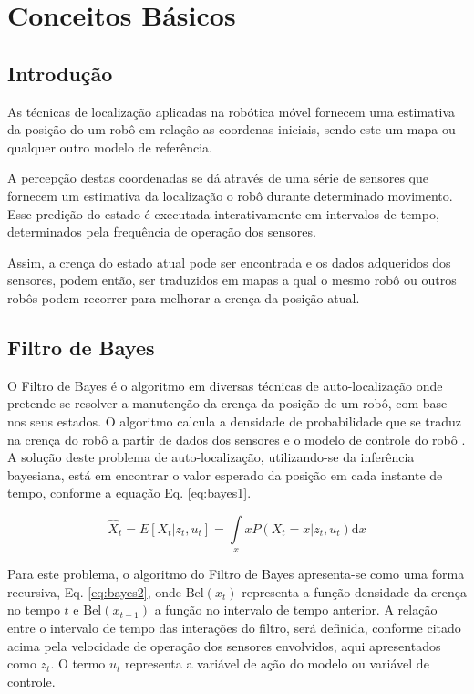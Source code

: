 \chapter{Conceitos Básicos}

 
\section{Introdução}\label{intro::cap3}

As técnicas de localização aplicadas na robótica móvel fornecem uma estimativa da posição do um robô em relação as coordenas iniciais, sendo este um mapa ou qualquer outro modelo de referência.

A percepção destas coordenadas se dá através de uma série de sensores que fornecem um estimativa da localização o robô durante determinado movimento. Esse predição do estado é executada interativamente em intervalos de tempo, determinados pela frequência de operação dos sensores. 

Assim, a crença do estado atual pode ser encontrada e os dados adqueridos dos sensores, podem então, ser traduzidos em mapas a qual o mesmo robô ou outros robôs podem recorrer para melhorar a crença da posição atual.

\section{Filtro de Bayes}

O Filtro de Bayes é o algoritmo em diversas técnicas de auto-localização onde pretende-se resolver a manutenção da crença da posição de um robô, com base nos seus estados. O algoritmo calcula a densidade de probabilidade que se traduz na crença do robô a partir de dados dos sensores e o modelo de controle do robô  \cite{thrun2006probalistic}. A solução deste problema de auto-localização, utilizando-se da inferência bayesiana, está em encontrar o valor esperado da posição em cada instante de tempo, conforme a equação Eq. \ref{eq:bayes1}.

\begin{equation}
    \label{eq:bayes1}
    \hat X_t = E\left[X_t| z_t, u_t\right] = \displaystyle \int\limits_x x P(X_t = x| z_t, u_t)\text{d}x
\end{equation}


Para este problema, o algoritmo do Filtro de Bayes apresenta-se como uma forma recursiva, Eq. \ref{eq:bayes2}, onde $\text{Bel}(x_t)$ representa a função densidade da crença no tempo $t$ e $\text{Bel}(x_{t-1})$ a função no intervalo de tempo anterior. A relação entre o intervalo de tempo das interações do filtro, será definida, conforme citado acima pela velocidade de operação dos sensores envolvidos, aqui apresentados como $z_t$. O termo $u_t$ representa a variável de ação do modelo ou variável de controle.


